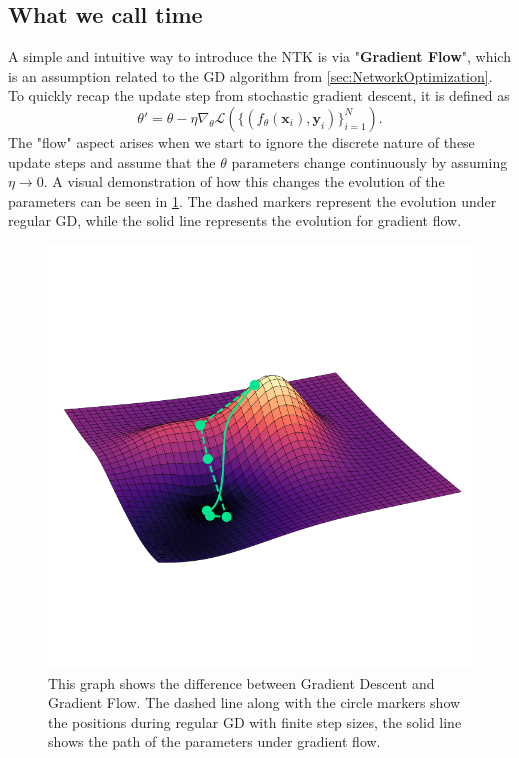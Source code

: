 \subsection{What we call time}
A simple and intuitive way to introduce the NTK is via "\textbf{Gradient Flow}", which is an assumption related to the GD algorithm from \cref{sec:NetworkOptimization}. To quickly recap the update step from stochastic gradient descent, it is defined as 
\begin{equation}
	\theta' = \theta - \eta \nabla_\theta \mathscr{L}\left( \{(f_\theta(\mathbf{x}_i), \mathbf{y}_i)\}_{i=1}^{N} \right).
\end{equation}
The "flow" aspect arises when we start to ignore the discrete nature of these update steps and assume that the $\theta$ parameters change continuously by assuming $\eta \rightarrow 0$. A visual demonstration of how this changes the evolution of the parameters can be seen in \cref{fig:GradientFlowPlot}. The dashed markers represent the evolution under regular GD, while the solid line represents the evolution for gradient flow.
\begin{figure}
	\centering
	\includegraphics[width=12cm, clip, trim = 0cm 2.3cm 0cm 3.5cm]{text/NTK/GradientFlowPlot.pdf}
	\caption{This graph shows the difference between Gradient Descent and Gradient Flow. The dashed line along with the circle markers show the positions during regular GD with finite step sizes, the solid line shows the path of the parameters under gradient flow.}
	\label{fig:GradientFlowPlot}
\end{figure}
